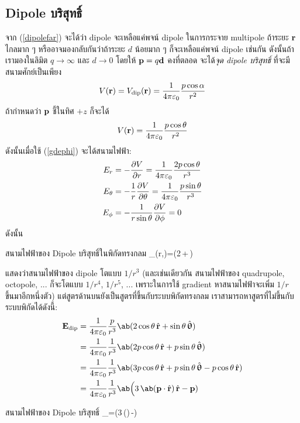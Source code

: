 \subsection{Dipole บริสุทธิ์}
จาก (\ref{dipolefar}) จะได้ว่า dipole จะเหลือแค่พจน์ dipole ในการกระจาย multipole ถ้าระยะ $\mathbf{r}$ ไกลมาก ๆ หรืออาจมองกลับกันว่าถ้าระยะ $d$ น้อยมาก ๆ ก็จะเหลือแค่พจน์ dipole เช่นกัน ดังนั้นถ้าเรามองในลิมิต $q\to\infty$ และ $d\to0$ โดยให้ $\mathbf{p}=q\mathbf{d}$ คงที่ตลอด จะได้\emph{จุด dipole บริสุทธิ์} ที่จะมีสนามศักย์เป็นเพียง
\begin{equation}
    V(\mathbf{r})=V_{\mathrm{dip}}(\mathbf{r})=\frac{1}{4\pi\varepsilon_0}\frac{p\cos\alpha}{r^2}
\end{equation}
ถ้ากำหนดว่า $\mathbf{p}$ ชี้ในทิศ $+z$ ก็จะได้
\[
V(\mathbf{r})=\frac{1}{4\pi\varepsilon_0}\frac{p\cos\theta}{r^2}
\]
ดังนั้นเมื่อใช้ (\ref{gdephi}) จะได้สนามไฟฟ้า:
\begin{align*}
    E_r&=-\pdv{V}{r}=\frac{1}{4\pi\varepsilon_0}\frac{2p\cos\theta}{r^3}\\
    E_\theta&=-\frac{1}{r}\pdv{V}{\theta}=\frac{1}{4\pi\varepsilon_0}\frac{p\sin\theta}{r^3}\\
    E_\phi&=-\frac{1}{r\sin\theta}\pdv{V}{\phi}=0
\end{align*}
ดังนั้น
\begin{eqbox}{สนามไฟฟ้าของ Dipole บริสุทธิ์ในพิกัดทรงกลม}
    _(r,\theta)=\kem{}\ab(2\cos\theta\,+\sin\theta\,\vus{\uptheta})
\end{eqbox}
แสดงว่าสนามไฟฟ้าของ dipole โตแบบ $1/r^3$ (และเช่นเดียวกัน สนามไฟฟ้าของ quadrupole, octopole, ... ก็จะโตแบบ $1/r^4$, $1/r^5$, ... เพราะในการใช้ gradient หาสนามไฟฟ้าจะเพิ่ม $1/r$ ขึ้นมาอีกหนึ่งตัว) แต่สูตรด้านบนยังเป็นสูตรที่ขึ้นกับระบบพิกัดทรงกลม เราสามารถหาสูตรที่ไม่ขึ้นกับระบบพิกัดได้ดังนี้:
\begin{align*}
    \vb{E}_\txt{dip}&=\kem\frac{p}{r^3}\ab(2\cos\theta\,\vu{r}+\sin\theta\,\vus{\uptheta})\\
    &=\kem\frac{1}{r^3}\ab(2p\cos\theta\,\vu{r}+p\sin\theta\,\vus{\uptheta})\\
    &=\kem\frac{1}{r^3}\ab(3p\cos\theta\,\vu{r}+p\sin\theta\,\vus{\uptheta}-p\cos\theta\,\vu{r})\\
    &=\kem\frac{1}{r^3}\ab\Big(3\,\ab(\vb{p}\cdot\vu{r})\,\vu{r}-\vb{p})
\end{align*}
\begin{eqbox}{สนามไฟฟ้าของ Dipole บริสุทธิ์}
    _=\kem{}\ab\Big(3\,\ab(\cdot{})\,-)\label{dipe}
\end{eqbox}